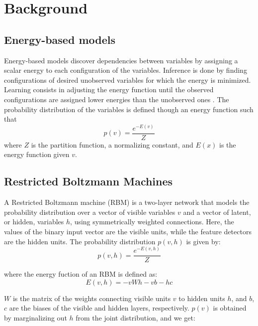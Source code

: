 \documentclass{report}
\begin{document}
\section{Background}
\subsection{Energy-based models}
Energy-based models discover dependencies between variables by assigning a scalar energy to each configuration of the variables. Inference is done by finding configurations of desired unobserved variables for which the energy is minimized. Learning consists in adjusting the energy function until the observed configurations are assigned lower energies than the unobserved ones \cite{LeCun}. The probability distribution of the variables is defined though an energy function such that
\begin{equation}
p(v) = \frac{e^{-E(v)}}{Z}
\end{equation}
where $Z$ is the partition function, a normalizing constant, and $E(x)$ is the energy function given $v$.

\subsection{Restricted Boltzmann Machines}

A Restricted Boltzmann machine (RBM) is a two-layer network that models the probability distribution over a vector of visible variables $v$ and a vector of latent, or hidden, variables $h$, using symmetrically weighted connections\cite{Mnih}. Here, the values of the binary input vector are the visible units, while the feature detectors are the hidden units. The probability distribution $p(v,h)$ is given by:
\begin{equation}
p(v,h) = \frac{e^{-E(v,h)}}{Z}
\end{equation}

where the energy fuction of an RBM is defined as:
\begin{equation}
E(v, h) = -vWh - vb - hc
\end{equation}

$W$ is the matrix of the weights connecting visible units $v$ to hidden units $h$, and $b$, $c$ are the biases of the visible and hidden layers, respectively. $p(v)$ is obtained by marginalizing out $h$ from the joint distribution, and we get:
\end{document}
